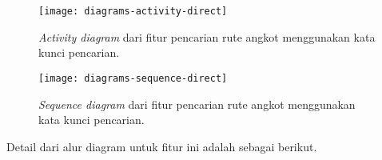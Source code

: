 \begin{figure}[ht]
    \centering
    \texttt{[image: diagrams-activity-direct]}
    \caption[Diagram \textit{use case} perkakas yang akan dibangun]{\textit{Activity diagram} dari fitur pencarian rute angkot menggunakan kata kunci pencarian.}
    \label{fig:diagrams-activity-direct}
\end{figure}

\begin{figure}[ht]
    \centering
    \texttt{[image: diagrams-sequence-direct]}
    \caption[Diagram \textit{use case} perkakas yang akan dibangun]{\textit{Sequence diagram} dari fitur pencarian rute angkot menggunakan kata kunci pencarian.}
    \label{fig:diagrams-sequence-direct}
\end{figure}

Detail dari alur diagram untuk fitur ini adalah sebagai berikut.

